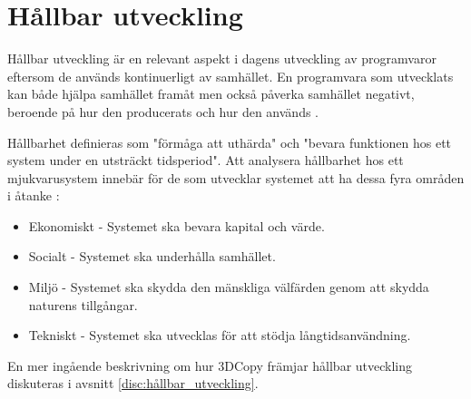 \section{Hållbar utveckling}

Hållbar utveckling är en relevant aspekt i dagens utveckling av programvaror eftersom de används kontinuerligt av samhället. En programvara som utvecklats kan både hjälpa samhället framåt men också påverka samhället negativt, beroende på hur den producerats och hur den används \cite{raturi2014developing}.

Hållbarhet definieras som "förmåga att uthärda" och "bevara funktionen hos ett system under en utsträckt tidsperiod". Att analysera hållbarhet hos ett mjukvarusystem innebär för de som utvecklar systemet att ha dessa fyra områden i åtanke \cite{lago2015framing}:

\begin{itemize}
	\item Ekonomiskt -  Systemet ska bevara kapital och värde.
	\item Socialt - Systemet ska underhålla samhället.
	\item Miljö - Systemet ska skydda den mänskliga välfärden genom att skydda naturens tillgångar.
	\item Tekniskt - Systemet ska utvecklas för att stödja långtidsanvändning.
\end{itemize}
En mer ingående beskrivning om hur 3DCopy främjar hållbar utveckling diskuteras i avsnitt \ref{disc:hållbar_utveckling}.


